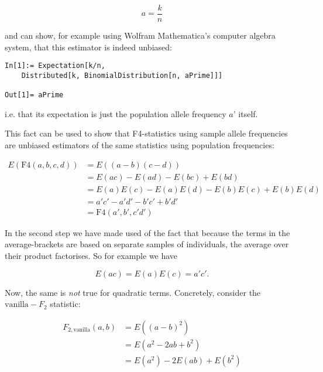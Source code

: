 \documentclass{article}
\begin{document}
\begin{equation}
a=\frac{k}{n}
\end{equation}

and can show, for example using Wolfram Mathematica's computer algebra system, that this estimator is indeed unbiased:

\begin{lstlisting}
In[1]:= Expectation[k/n, 
    Distributed[k, BinomialDistribution[n, aPrime]]]

Out[1]= aPrime
\end{lstlisting}

i.e. that its expectation is just the population allele frequency \(a\){'} itself.

This fact can be used to show that F4-statistics using sample allele frequencies are unbiased estimators of the same statistics using population
frequencies:

\begin{equation}
\begin{split}
E\left( \text{F4}(a,b,c,d)\right) &=E((a-b)(c-d)) \\
&=E(ac) -E(ad) -E(bc) +E(bd) \\
&= E(a) E(c) -E(a) E(d) -E(b) E(c) +E(b) E(d) \\
&=a'c'-a'd'-b'c'+b'd'\\
&=\text{F4}(a',b',c'd')
\end{split}
\end{equation}

In the second step we have made used of the fact that because the terms in the average-brackets are based on separate samples of individuals, the
average over their product factorises. So for example we have 

\begin{equation}
\label{eq_freq_unbiased}
E(a c) =E(a) E(c) =a' c' .
\end{equation}

Now, the same is \textit{ not }true for quadratic terms. Concretely, consider the \(\text{vanilla}-F_2\) { }statistic:

\begin{equation}
\begin{split}
F_{2,\text{vanilla}}(a,b)&=E\left((a-b)^2\right)\\
&= E\left(a^2-2a b+b^2\right)\\
&= E\left(a^2\right) -2E\left(a b\right)
+E(b^2)
\end{split}
\end{equation}
\end{document}
